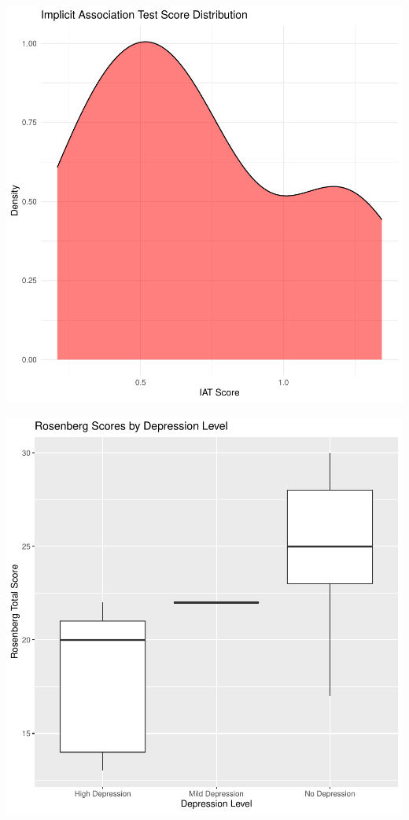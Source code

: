 \documentclass[
  man,
  longtable,
  nolmodern,
  notxfonts,
  notimes,
  colorlinks=true,linkcolor=blue,citecolor=blue,urlcolor=blue]{apa7}
\begin{document}
\includegraphics{SE-SCC-Depression_files/figure-pdf/IAT-score-distribution-1.pdf}

\includegraphics{SE-SCC-Depression_files/figure-pdf/RSES-versus-CESD-level-1.pdf}
\end{document}
